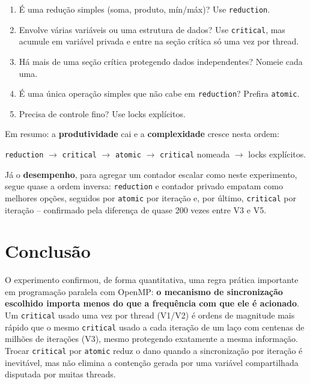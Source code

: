 \documentclass[a4paper,12pt]{article}
\begin{document}
\begin{enumerate}
    \item É uma redução simples (soma, produto, mín/máx)? Use
    \texttt{reduction}.
    \item Envolve várias variáveis ou uma estrutura de dados? Use
    \texttt{critical}, mas acumule em variável privada e entre na
    seção crítica só uma vez por thread.
    \item Há mais de uma seção crítica protegendo dados
    independentes? Nomeie cada uma.
    \item É uma única operação simples que não cabe em
    \texttt{reduction}? Prefira \texttt{atomic}.
    \item Precisa de controle fino? Use locks explícitos.
\end{enumerate}

Em resumo: a \textbf{produtividade} cai e a \textbf{complexidade}
cresce nesta ordem: 

\begin{center}
    \texttt{reduction} $\rightarrow$ \texttt{critical} 
    $\rightarrow$ \texttt{atomic}
    $\rightarrow$ \texttt{critical} nomeada $\rightarrow$ locks
    explícitos.
\end{center}

Já o \textbf{desempenho}, para agregar um contador
escalar como neste experimento, segue quase a ordem inversa:
\texttt{reduction} e contador privado empatam como melhores opções,
seguidos por \texttt{atomic} por iteração e, por último,
\texttt{critical} por iteração -- confirmado pela diferença de quase
200 vezes entre V3 e V5.

\section{Conclusão}

O experimento confirmou, de forma quantitativa, uma regra prática
importante em programação paralela com OpenMP: \textbf{o mecanismo de
sincronização escolhido importa menos do que a frequência com que ele
é acionado}. Um \texttt{critical} usado uma vez por thread (V1/V2) é
ordens de magnitude mais rápido que o mesmo \texttt{critical} usado a
cada iteração de um laço com centenas de milhões de iterações (V3),
mesmo protegendo exatamente a mesma informação. Trocar
\texttt{critical} por \texttt{atomic} reduz o dano quando a
sincronização por iteração é inevitável, mas não elimina a contenção
gerada por uma variável compartilhada disputada por muitas threads.
\end{document}
